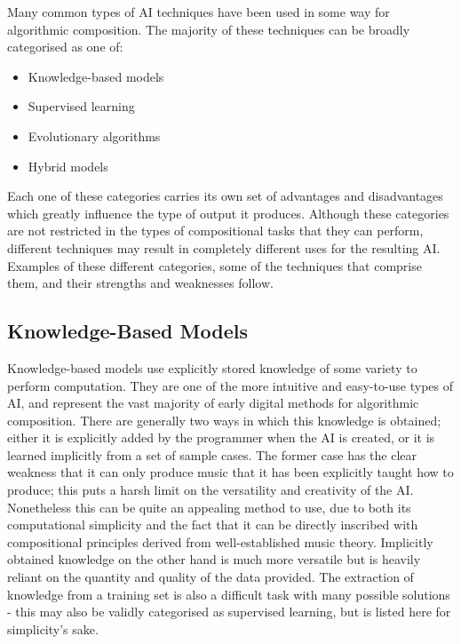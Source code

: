 \documentclass[ author={Stephen Livermore-Tozer},
				supervisor={Dr. Peter Flach},
				degree={MEng},
				title={Algorithmic Co-composition Using Machine Learning},
				subtitle={},
				type={research},
				year={2016} ]{dissertation}
\begin{document}
	Many common types of AI techniques have been used in some way for algorithmic composition. The majority of these techniques can be broadly categorised as one of:
	\begin{itemize}
		\item Knowledge-based models
		\item Supervised learning
		\item Evolutionary algorithms
		\item Hybrid models
	\end{itemize}
	Each one of these categories carries its own set of advantages and disadvantages which greatly influence the type of output it produces. Although these categories are not restricted in the types of compositional tasks that they can perform, different techniques may result in completely different uses for the resulting AI. Examples of these different categories, some of the techniques that comprise them, and their strengths and weaknesses follow.
	
	\subsection{Knowledge-Based Models}
	\label{sec:knowledge-systems}
	
	Knowledge-based models use explicitly stored knowledge of some variety to perform computation. They are one of the more intuitive and easy-to-use types of AI, and represent the vast majority of early digital methods for algorithmic composition. There are generally two ways in which this knowledge is obtained; either it is explicitly added by the programmer when the AI is created, or it is learned implicitly from a set of sample cases. The former case has the clear weakness that it can only produce music that it has been explicitly taught how to produce; this puts a harsh limit on the versatility and creativity of the AI. Nonetheless this can be quite an appealing method to use, due to both its computational simplicity and the fact that it can be directly inscribed with compositional principles derived from well-established music theory. Implicitly obtained knowledge on the other hand is much more versatile but is heavily reliant on the quantity and quality of the data provided. The extraction of knowledge from a training set is also a difficult task with many possible solutions - this may also be validly categorised as supervised learning, but is listed here for simplicity's sake. 
	
\end{document}
